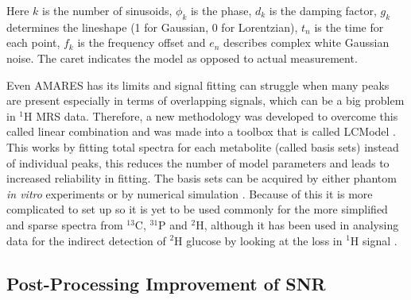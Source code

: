 \noindent Here $k$ is the number of sinusoids, $\phi_k$ is the phase, $d_k$ is the damping factor, $g_k$ determines the lineshape (1 for Gaussian, 0 for Lorentzian), $t_n$ is the time for each point, $f_k$ is the frequency offset and $e_n$ describes complex white Gaussian noise. The caret indicates the model as opposed to actual measurement.

Even \ac{AMARES} has its limits and signal fitting can struggle when many peaks are present especially in terms of overlapping signals, which can be a big problem in $^1$H \ac{MRS} data. Therefore, a new methodology was developed to overcome this called linear combination and was made into a toolbox that is called LCModel \cite{Provencher1993EstimationSpectra}. This works by fitting total spectra for each metabolite (called basis sets) instead of individual peaks, this reduces the number of model parameters and leads to increased reliability in fitting. The basis sets can be acquired by either phantom \textit{in vitro} experiments or by numerical simulation \cite{Near2021PreprocessingRecommendations}. Because of this it is more complicated to set up so it is yet to be used commonly for the more simplified and sparse spectra from $^{13}$C, $^{31}$P and $^2$H, although it has been used in analysing data for the indirect detection of $^2$H glucose by looking at the loss in $^1$H signal \cite{Rich20201HVivo,Cember2022IntegratingHumans,Niess2023Reproducibility3T}. 

\subsection{Post-Processing Improvement of SNR}
\label{Chap:Theory:denoise}

